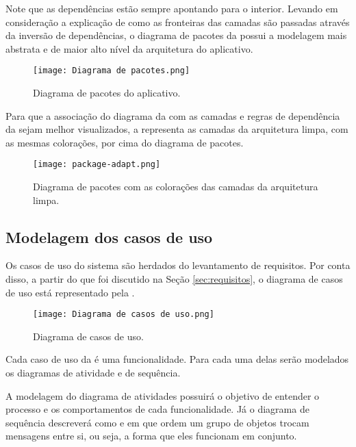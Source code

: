 Note que as dependências estão sempre apontando para o interior. Levando em consideração a explicação de como as fronteiras das camadas são passadas através da inversão de dependências, o diagrama de pacotes da  possui a modelagem mais abstrata e de maior alto nível da arquitetura do aplicativo. 

\begin{figure}[!htb]
  \centering
  \texttt{[image: Diagrama de pacotes.png]}
  \caption{Diagrama de pacotes do aplicativo.}
  \label{fig:package}
\end{figure}

Para que a associação do diagrama da  com as camadas e regras de dependência da  sejam melhor visualizados, a  representa as camadas da arquitetura limpa, com as mesmas colorações, por cima do diagrama de pacotes.

\begin{figure}[!htb]
  \centering
  \texttt{[image: package-adapt.png]}
  \caption{Diagrama de pacotes com as colorações das camadas da arquitetura limpa.}
  \label{fig:package2}
\end{figure}

\subsection{Modelagem dos casos de uso}
Os casos de uso do sistema são herdados do levantamento de requisitos. Por conta disso, a partir do que foi discutido na Seção \ref{sec:requisitos}, o diagrama de casos de uso está representado pela .

\begin{figure}[!htb]
  \centering
  \texttt{[image: Diagrama de casos de uso.png]}
  \caption{Diagrama de casos de uso.}
  \label{fig:usecasesdiagram}
\end{figure}

Cada caso de uso da  é uma funcionalidade. Para cada uma delas serão modelados os diagramas de atividade e de sequência.

A modelagem do diagrama de atividades possuirá o objetivo de entender o processo e os comportamentos de cada funcionalidade. Já o diagrama de sequência descreverá como e em que ordem um grupo de objetos trocam mensagens entre si, ou seja, a forma que eles funcionam em conjunto.

